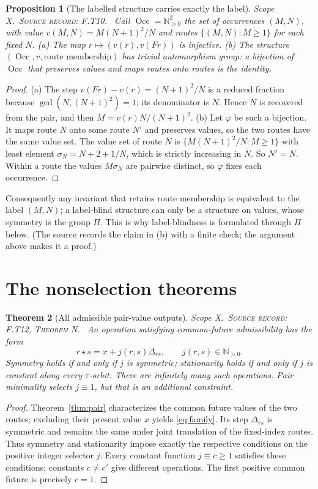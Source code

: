 \documentclass[11pt,oneside,openany]{book}
\newtheorem{theorem}{Theorem}[chapter]
\newtheorem{proposition}[theorem]{Proposition}
\theoremstyle{definition}
\theoremstyle{remark}
\newcommand{\N}{\mathbb{N}}
\newcommand{\gcdop}{\operatorname{gcd}}
\newcommand{\scope}[1]{\textsf{\small Scope #1.}\ }
\newcommand{\record}[1]{\textup{\textsc{Source record: #1.}}\ }
\newcommand{\Del}{\Delta}
\begin{document}
\begin{proposition}[The labelled structure carries exactly the label]\label{prop:labelled}
\scope{X}\record{F.T10} Call \(\operatorname{Occ}=\N_{>0}^2\) the set of occurrences \((M,N)\), with value \(v(M,N)=M(N+1)^2/N\) and routes \(\{(M,N):M\ge1\}\) for each fixed \(N\). (a) The map \(r\mapsto(v(r),v(F r))\) is injective. (b) The structure \((\operatorname{Occ},v,\text{route membership})\) has trivial automorphism group: a bijection of \(\operatorname{Occ}\) that preserves values and maps routes onto routes is the identity.
\end{proposition}
\begin{proof}
(a) The step \(v(Fr)-v(r)=(N+1)^2/N\) is a reduced fraction because \(\gcdop(N,(N+1)^2)=1\); its denominator is \(N\). Hence \(N\) is recovered from the pair, and then \(M=v(r)N/(N+1)^2\).
(b) Let \(\varphi\) be such a bijection. It maps route \(N\) onto some route \(N'\) and preserves values, so the two routes have the same value set. The value set of route \(N\) is \(\{M(N+1)^2/N:M\ge1\}\) with least element \(\sigma_N=N+2+1/N\), which is strictly increasing in \(N\). So \(N'=N\). Within a route the values \(M\sigma_N\) are pairwise distinct, so \(\varphi\) fixes each occurrence.
\end{proof}
Consequently any invariant that retains route membership is equivalent to the label \((M,N)\); a label-blind structure can only be a structure on values, whose symmetry is the group \(\Pi\). This is why label-blindness is formulated through \(\Pi\) below. (The source records the claim in (b) with a finite check; the argument above makes it a proof.)

\section{The nonselection theorems}
\begin{theorem}[All admissible pair-value outputs]\label{thm:star-family}
\scope{X}\record{F.T12, Theorem N} An operation satisfying common-future admissibility has the form
\begin{equation}\label{eq:family}
 r\star s=x+j(r,s)\Del_{rs},\qquad j(r,s)\in\N_{>0}.
\end{equation}
Symmetry holds if and only if \(j\) is symmetric; stationarity holds if and only if \(j\) is constant along every \(\tau\)-orbit. There are infinitely many such operations. Pair minimality selects \(j\equiv1\), but that is an additional constraint.
\end{theorem}
\begin{proof}
Theorem~\ref{thm:pair} characterizes the common future values of the two routes; excluding their present value \(x\) yields \eqref{eq:family}. Its step \(\Del_{rs}\) is symmetric and remains the same under joint translation of the fixed-index routes. Thus symmetry and stationarity impose exactly the respective conditions on the positive integer selector \(j\). Every constant function \(j\equiv c\ge1\) satisfies these conditions; constants \(c\ne c'\) give different operations. The first positive common future is precisely \(c=1\).
\end{proof}
\end{document}
